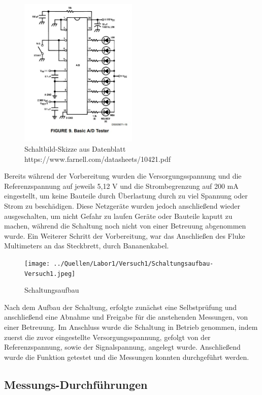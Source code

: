 \documentclass[a4paper,12pt]{article}
\begin{document}
\begin{figure}[H]
    \centering
    \includegraphics[width=0.5\textwidth]{../Quellen/Labor1/Versuch1/Schaltung ADC mit LEDBar.png}
\caption{Schaltbild-Skizze aus Datenblatt https://www.farnell.com/datasheets/10421.pdf}
\end{figure}

\noindent Bereits während der Vorbereitung wurden die Versorgungsspannung und die Referenzspannung auf jeweils 5,12 V und die Strombegrenzung auf 200 mA  eingestellt, um keine Bauteile durch Überlastung durch zu viel Spannung oder Strom zu beschädigen. Diese Netzgeräte wurden jedoch anschließend wieder ausgeschalten, um nicht Gefahr zu laufen Geräte oder Bauteile kaputt zu machen, während die Schaltung noch nicht von einer Betreuung abgenommen wurde. Ein Weiterer Schritt der Vorbereitung, war das Anschließen des Fluke Multimeters an das Steckbrett, durch Bananenkabel.

\begin{figure}[H]
    \centering
    \texttt{[image: ../Quellen/Labor1/Versuch1/Schaltungsaufbau-Versuch1.jpeg]}
    \caption{Schaltungsaufbau}
\end{figure}

\noindent Nach dem Aufbau der Schaltung, erfolgte zunächst eine Selbstprüfung und anschließend eine Abnahme und Freigabe für die anstehenden Messungen, von einer Betreuung. Im Anschluss wurde die Schaltung in Betrieb genommen, indem zuerst die zuvor eingestellte Versorgungsspannung, gefolgt von der Referenzspannung, sowie der Signalspannung, angelegt wurde. Anschließend wurde die Funktion getestet und die Messungen konnten durchgeführt werden.

\subsection{Messungs-Durchführungen}
\end{document}
